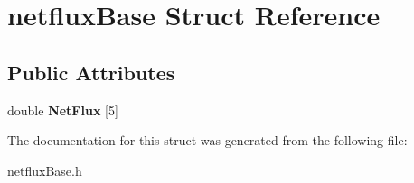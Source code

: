 \hypertarget{structnetfluxBase}{}\section{netflux\+Base Struct Reference}
\label{structnetfluxBase}
\subsection*{Public Attributes}
\begin{DoxyCompactItemize}
\item 
double {\bfseries Net\+Flux} \mbox{[}5\mbox{]}\hypertarget{structnetfluxBase_ad4d2b2222203ae1dae00d845d17ead5f}{}\label{structnetfluxBase_ad4d2b2222203ae1dae00d845d17ead5f}

\end{DoxyCompactItemize}


The documentation for this struct was generated from the following file\+:\begin{DoxyCompactItemize}
\item 
netflux\+Base.\+h\end{DoxyCompactItemize}
